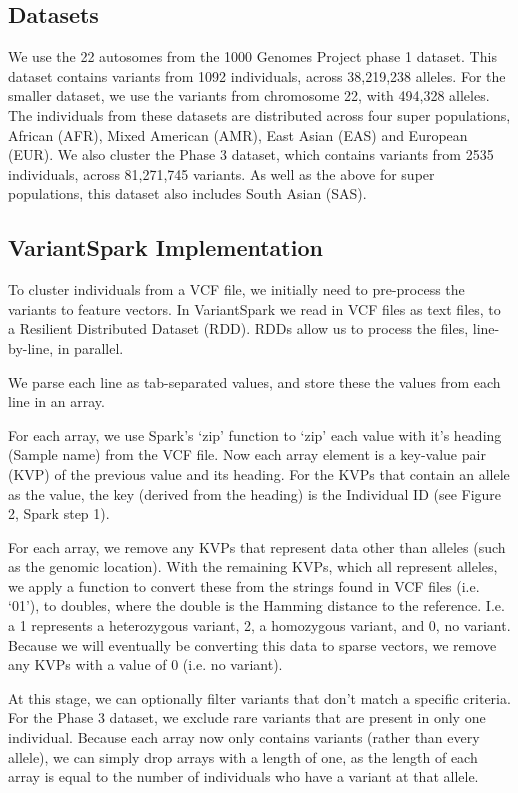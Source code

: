 \documentclass{bmcart}
\newcommand{\variantSpark}{{\sc VariantSpark}}
\begin{document}
\subsection*{Datasets}
We use the 22 autosomes from the 1000 Genomes Project phase 1 dataset. This dataset contains variants from 1092 individuals, across 38,219,238 alleles.
For the smaller dataset, we use the variants from chromosome 22, with 494,328 alleles.
The individuals from these datasets are distributed across four super populations, African (AFR), Mixed American (AMR), East Asian (EAS) and European (EUR).
We also cluster the Phase 3 dataset, which contains variants from 2535 individuals, across 81,271,745 variants. As well as the above for super populations, this
dataset also includes South Asian (SAS).



\subsection*{VariantSpark Implementation}
To cluster individuals from a VCF file, we initially need to pre-process the variants to feature vectors.
In \variantSpark{} we read in VCF files as text files, to a Resilient Distributed Dataset (RDD). RDDs allow us to process the files, line-by-line, in parallel.

We parse each line as tab-separated values, and store these the values from each line in an array.

For each array, we use Spark's `zip' function to `zip' each value with it's heading (Sample name) from the VCF file. Now each array element is a
key-value pair (KVP) of the previous value and its heading. For the KVPs that contain an allele as the value, the key (derived from the heading) is
the Individual ID (see Figure 2, Spark step 1).

For each array, we remove any KVPs that represent data other than alleles (such as the genomic location). With the remaining KVPs, which all
represent alleles, we apply a function to convert these from the strings found in VCF files (i.e. `0\textbar{}1'), to doubles, where the double is the
Hamming distance to the reference. I.e. a 1 represents a heterozygous variant, 2, a homozygous variant, and 0, no variant. Because we will
eventually be converting this data to sparse vectors, we remove any KVPs with a value of 0 (i.e. no variant).

At this stage, we can optionally filter variants that don't match a specific criteria. For the Phase 3 dataset, we exclude rare variants that are present in
only one individual. Because each array now only contains variants (rather than every allele), we can simply drop arrays with a length of one, as the length
of each array is equal to the number of individuals who have a variant at that allele.
\end{document}
